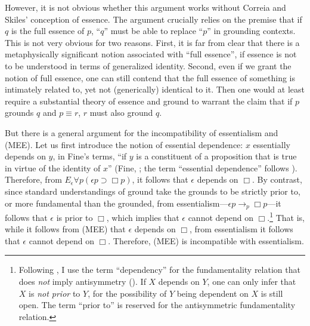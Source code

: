 \documentclass[12pt]{article}
\begin{document}
\par
However, it is not obvious whether this argument works without Correia and Skiles' conception of essence. The argument crucially relies on the premise that if $q$ is the full essence of $p$, ``$q$'' must be able to replace ``$p$'' in grounding contexts. This is not very obvious for two reasons. First, it is far from clear that there is a metaphysically significant notion associated with ``full essence'', if essence is not to be understood in terms of generalized identity. Second, even if we grant the notion of full essence, one can still contend that the full essence of something is intimately related to, yet not (generically) identical to it. Then one would at least require a substantial theory of essence and ground to warrant the claim that if $p$ grounds $q$ and $p \equiv r$, $r$ must also ground $q$. 
\par
But there is a general argument for the incompatibility of essentialism and (MEE). Let us first introduce the notion of essential dependence: $x$ essentially depends on $y$, in Fine's terms, ``if $y$ is a constituent of a proposition that is true in virtue of the identity of $x$'' (Fine, \citeyear[275]{Fine1995-FINXD}; the term ``essential dependence'' follows \citet{Correia2008-COROD}). Therefore, from $E_\epsilon \forall p(\epsilon p \supset \Box p)$, it follows that $\epsilon$ depends on $\Box$. By contrast, since standard understandings of ground \citep{Schaffer2009-SCHOWG,Fine2012-FINGTG} take the grounds to be strictly prior to, or more fundamental than the grounded, from essentialism---$\epsilon p \bm{\rightarrow}_p \Box p$---it follows that $\epsilon$ is prior to $\Box$, which implies that $\epsilon$ cannot depend on $\Box$.\footnote{
    Following \citet{Fine1995-FINXD}, I use the term ``dependency'' for the fundamentality relation that does \textit{not} imply antisymmetry (\citeyear[282--3]{Fine1995-FINXD}). If $X$ depends on $Y$, one can only infer that $X$ is \textit{not prior} to $Y$, for the possibility of $Y$ being dependent on $X$ is still open. The term ``prior to'' is reserved for the antisymmetric fundamentality relation.
} That is, while it follows from (MEE) that $\epsilon$ depends on $\Box$, from essentialism it follows that $\epsilon$ cannot depend on $\Box$. Therefore, (MEE) is incompatible with essentialism.
\par
\end{document}
